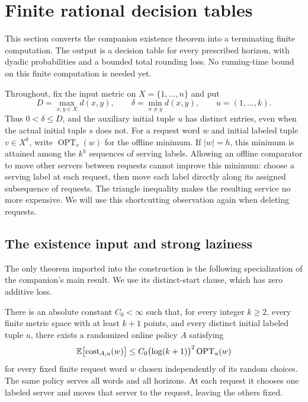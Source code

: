 \section{Finite rational decision tables}\label{sec:finite-tables}

This section converts the companion existence theorem into a terminating
finite computation. The output is a decision table for every prescribed
horizon, with dyadic probabilities and a bounded total rounding loss.
No running-time bound on this finite computation is needed yet.

Throughout, fix the input metric on $X=\{1,\ldots,n\}$ and put
\begin{equation}\label{eq:metric-parameters}
 D=\max_{x,y\in X}d(x,y),\qquad
 \delta=\min_{x\ne y}d(x,y),\qquad u=(1,\ldots,k).
\end{equation}
Thus $0<\delta\le D$, and the auxiliary initial tuple $u$ has distinct
entries, even when the actual initial tuple $s$ does not.
For a request word $w$ and initial labeled tuple $v\in X^k$, write
$\operatorname{OPT}_v(w)$ for the offline minimum. If $|w|=h$, this
minimum is attained among the $k^h$ sequences of serving labels.
Allowing an offline comparator to move other servers between requests
cannot improve this minimum: choose a serving label at each request,
then move each label directly along its assigned subsequence of requests.
The triangle inequality makes the resulting service no more expensive.
We will use this shortcutting observation again when deleting requests.

\subsection{The existence input and strong laziness}

The only theorem imported into the construction is the following
specialization of the companion's main result. We use its distinct-start
clause, which has zero additive loss.

\begin{theorem}\label{thm:existence}
There is an absolute constant $C_0<\infty$ such that, for every integer
$k\ge2$, every finite metric space with at least $k+1$ points, and every
distinct initial labeled tuple $u$, there exists a randomized online
policy $A$ satisfying
\begin{equation}\label{eq:external-existence}
 \mathbb E\bigl[\operatorname{cost}_{A,u}(w)\bigr]
 \le C_0\bigl(\log(k+1)\bigr)^2\operatorname{OPT}_u(w)
\end{equation}
for every fixed finite request word $w$ chosen independently of its
random choices. The same policy serves all words and all horizons. At
each request it chooses one labeled server and moves that server to the
request, leaving the others fixed.
\end{theorem}


